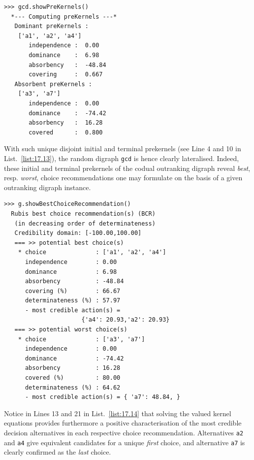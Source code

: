 \begin{lstlisting}[caption={Computing the prekernels of the strict outranking digraph \texttt{gcd}},label=list:17.13]
>>> gcd.showPreKernels()
  *--- Computing preKernels ---*
   Dominant preKernels :
    ['a1', 'a2', 'a4']
       independence :  0.00
       dominance    :  6.98
       absorbency   :  -48.84
       covering     :  0.667
   Absorbent preKernels :
    ['a3', 'a7']
       independence :  0.00
       dominance    :  -74.42
       absorbency   :  16.28
       covered      :  0.800
\end{lstlisting}
With such unique disjoint initial and terminal prekernels (see Line 4 and 10 in List.~\vref{list:17.13}), the random digraph \texttt{gcd} is hence clearly lateralised. Indeed, these initial and terminal prekernels of the codual outranking digraph reveal \emph{best}, resp. \emph{worst}, choice recommendations one may formulate on the basis of a given outranking digraph instance.
\begin{lstlisting}[caption={Computing a best and worst choice recommendation from digraph \texttt{gcd}},label=list:17.14]
>>> g.showBestChoiceRecommendation()
  Rubis best choice recommendation(s) (BCR)
   (in decreasing order of determinateness)   
   Credibility domain: [-100.00,100.00]
   === >> potential best choice(s)
    * choice              : ['a1', 'a2', 'a4']
      independence        : 0.00
      dominance           : 6.98
      absorbency          : -48.84
      covering (%)        : 66.67
      determinateness (%) : 57.97
      - most credible action(s) =
                      {'a4': 20.93,'a2': 20.93}
   === >> potential worst choice(s) 
    * choice              : ['a3', 'a7']
      independence        : 0.00
      dominance           : -74.42
      absorbency          : 16.28
      covered (%)         : 80.00
      determinateness (%) : 64.62
      - most credible action(s) = { 'a7': 48.84, }
\end{lstlisting}

Notice in Lines 13 and 21 in List.~\vref{list:17.14} that solving the valued \Berge kernel equations provides furthermore a positive characterisation of the most credible decision alternatives in each respective choice recommendation. Alternatives \texttt{a2} and \texttt{a4} give equivalent candidates for a unique \emph{first} choice, and alternative \texttt{a7} is clearly confirmed as the \emph{last} choice.

